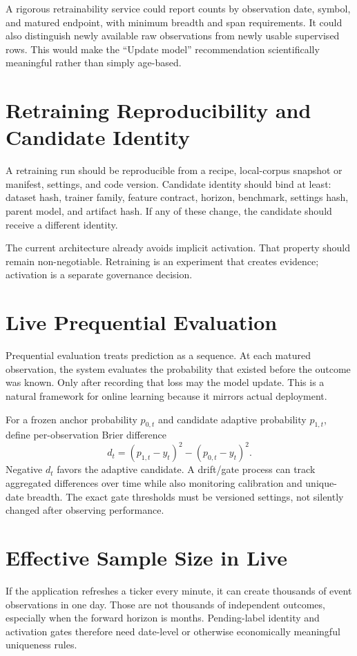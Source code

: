 \documentclass[11pt]{article}
\begin{document}
A rigorous retrainability service could report counts by observation date, symbol, and matured endpoint, with minimum breadth and span requirements. It could also distinguish newly available raw observations from newly usable supervised rows. This would make the ``Update model'' recommendation scientifically meaningful rather than simply age-based.

\section{Retraining Reproducibility and Candidate Identity}
A retraining run should be reproducible from a recipe, local-corpus snapshot or manifest, settings, and code version. Candidate identity should bind at least: dataset hash, trainer family, feature contract, horizon, benchmark, settings hash, parent model, and artifact hash. If any of these change, the candidate should receive a different identity.

The current architecture already avoids implicit activation. That property should remain non-negotiable. Retraining is an experiment that creates evidence; activation is a separate governance decision.

\section{Live Prequential Evaluation}
Prequential evaluation treats prediction as a sequence. At each matured observation, the system evaluates the probability that existed before the outcome was known. Only after recording that loss may the model update. This is a natural framework for online learning because it mirrors actual deployment.

For a frozen anchor probability $p_{0,t}$ and candidate adaptive probability $p_{1,t}$, define per-observation Brier difference
\begin{equation}
d_t=(p_{1,t}-y_t)^2-(p_{0,t}-y_t)^2.
\end{equation}
Negative $d_t$ favors the adaptive candidate. A drift/gate process can track aggregated differences over time while also monitoring calibration and unique-date breadth. The exact gate thresholds must be versioned settings, not silently changed after observing performance.

\section{Effective Sample Size in Live}
If the application refreshes a ticker every minute, it can create thousands of event observations in one day. Those are not thousands of independent outcomes, especially when the forward horizon is months. Pending-label identity and activation gates therefore need date-level or otherwise economically meaningful uniqueness rules.
\end{document}

